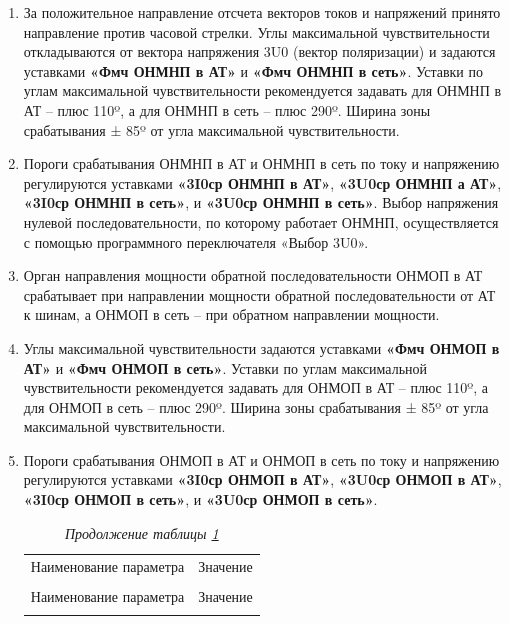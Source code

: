 \begin{enumerate}[label=\arabic{section}.\arabic{subsection}.\arabic*,  align=left, labelsep=4pt, leftmargin=0pt, itemindent=57pt]
\item
За положительное направление отсчета векторов токов и напряжений принято направление против
часовой стрелки. Углы максимальной чувствительности откладываются от вектора напряжения 3U0 (вектор
поляризации) и задаются уставками \textbf{«Фмч ОНМНП в АТ»} и \textbf{«Фмч ОНМНП в сеть»}. Уставки по углам
максимальной чувствительности рекомендуется задавать для ОНМНП в АТ – плюс 110º, а для ОНМНП в сеть
– плюс 290º. Ширина зоны срабатывания ± 85º от угла максимальной чувствительности.

\item
Пороги срабатывания ОНМНП в АТ и ОНМНП в сеть по току и напряжению регулируются уставками 
\textbf{«3I0ср ОНМНП в АТ»}, \textbf{«3U0ср ОНМНП а АТ»}, \textbf{«3I0ср ОНМНП в сеть»}, и \textbf{«3U0ср ОНМНП в сеть»}. Выбор
напряжения нулевой последовательности, по которому работает ОНМНП, осуществляется с помощью
программного переключателя «Выбор 3U0».

\item
Орган направления мощности обратной последовательности ОНМОП в АТ срабатывает при
направлении мощности обратной последовательности от АТ к шинам, а ОНМОП в сеть – при обратном
направлении мощности. 

\item
Углы максимальной чувствительности задаются уставками \textbf{«Фмч ОНМОП в АТ»} и \textbf{«Фмч ОНМОП
в сеть»}. Уставки по углам максимальной чувствительности рекомендуется задавать для ОНМОП в АТ – плюс
110º, а для ОНМОП в сеть – плюс 290º. Ширина зоны срабатывания ± 85º от угла максимальной
чувствительности.

\item
Пороги срабатывания ОНМОП в АТ и ОНМОП в сеть по току и напряжению регулируются уставками 
\textbf{«3I0ср ОНМОП в АТ»}, \textbf{«3U0ср ОНМОП в АТ»}, \textbf{«3I0ср ОНМОП в сеть»}, и \textbf{«3U0ср ОНМОП в сеть»}.

\small
\setlength{\extrarowheight}{0.05cm} %
\begin{longtable}
{|>{\centering\arraybackslash}m{15.2cm}|>{\centering\arraybackslash}m{1.7cm}|}
\caption{Параметры ОНМНП(ОНМОП)\hfill\vspace{-0.5\baselineskip}}\label{desc_tnznp:tbl1}\\ 
\hhline{|-|-|}
\rowcolor{gray!30}
Наименование параметра & Значение  \\ 
\hhline{|-|-|}
\endfirsthead

\caption*{\hspace{3pt}\emph{Продолжение таблицы \ref{desc_tnznp:tbl1}\hfill\vspace{-0.5\baselineskip}}} \\ %
\hhline{|-|-|}
\rowcolor{gray!30}
Наименование параметра & Значение  \\ 
\hhline{|-|-|}
\endhead
\hhline{|-|-|}


\end{longtable}
\end{enumerate}
